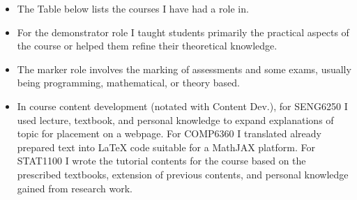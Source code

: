 \documentclass{myresume}
\begin{document}
            \begin{itemize}
                \item The Table below lists the courses I have had a role in.
                \item For the demonstrator role I taught students primarily the
                        practical aspects of the course or helped them refine
                            their theoretical knowledge.
                \item The marker role involves the marking of assessments and
                        some exams, usually being programming, mathematical, or theory based.
                \item In course content development (notated with Content Dev.), for SENG6250 I used lecture, textbook,
                        and personal knowledge to expand explanations of topic for placement on a webpage. For COMP6360 I
                        translated already prepared text into LaTeX code suitable for a MathJAX platform. For STAT1100 I
                        wrote the tutorial contents for the course based on the prescribed textbooks, extension of previous
                        contents, and personal knowledge gained from research work.
            \end{itemize}
\end{document}

